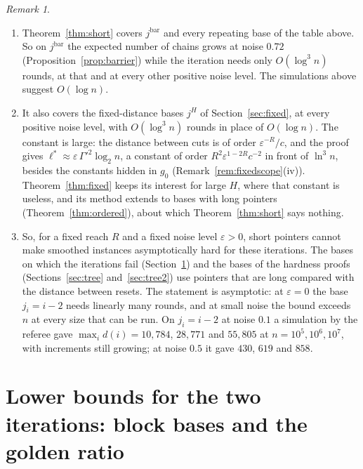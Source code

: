 \documentclass[11pt]{amsart}
\theoremstyle{definition}
\theoremstyle{remark}
\newtheorem{remark}[theorem]{Remark}
\newcommand{\eps}{\varepsilon}
\begin{document}
\begin{remark}\label{rem:short}
\begin{enumerate}[label=(\roman*),leftmargin=2.4em]
\item Theorem~\ref{thm:short} covers $j^{\mathrm{bar}}$ and every repeating base of the table
above. So on $j^{\mathrm{bar}}$ the expected number of chains grows at noise $0.72$
(Proposition~\ref{prop:barrier}) while the iteration needs only $O(\log^3n)$ rounds, at that and
at every other positive noise level. The simulations above suggest $O(\log n)$.
\item It also covers the fixed-distance bases $j^H$ of Section~\ref{sec:fixed}, at every positive
noise level, with $O(\log^3n)$ rounds in place of $O(\log n)$. The constant is large: the
distance between cuts is of order $\eps^{-R}/c$, and the proof gives
$\ell^*\approx\eps\,\Gamma'^2\log_2n$, a constant of order $R^2\eps^{1-2R}c^{-2}$ in front of
$\ln^3n$, besides the constants hidden in $g_0$ (Remark~\ref{rem:fixedscope}(iv)).
Theorem~\ref{thm:fixed} keeps its interest for large $H$, where that constant is useless, and its
method extends to bases with long pointers (Theorem~\ref{thm:ordered}), about which
Theorem~\ref{thm:short} says nothing.
\item So, for a fixed reach $R$ and a fixed noise level $\eps>0$, short pointers cannot make
smoothed instances asymptotically hard for these iterations. The bases on which the iterations fail
(Section~\ref{sec:block}) and the bases of the hardness proofs (Sections~\ref{sec:tree}
and~\ref{sec:tree2}) use pointers that are long compared with the distance between resets. The
statement is asymptotic: at $\eps=0$ the base $j_i=i-2$ needs linearly many rounds, and at small
noise the bound exceeds $n$ at every size that can be run. On $j_i=i-2$ at noise $0.1$ a simulation
by the referee gave $\max_id(i)=10{,}784$, $28{,}771$ and $55{,}805$ at $n=10^5,10^6,10^7$, with
increments still growing; at noise $0.5$ it gave $430$, $619$ and $858$.
\end{enumerate}
\end{remark}

\section{Lower bounds for the two iterations: block bases and the golden ratio}\label{sec:block}
\end{document}

